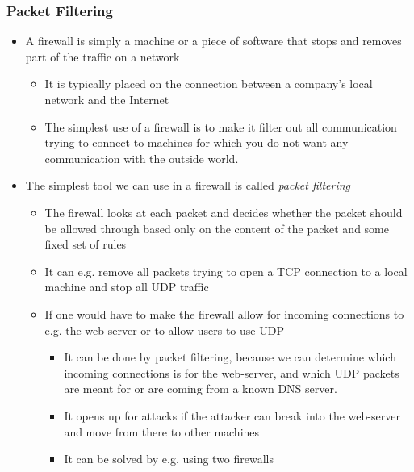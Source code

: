 \documentclass[11pt]{article}
\begin{document}
\subsubsection{Packet Filtering}
\label{sec:org7b58403}
\begin{itemize}
\item A firewall is simply a machine or a piece of software that stops and removes part of the traffic on a network
\begin{itemize}
\item It is typically placed on the connection between a company's local network and the Internet
\item The simplest use of a firewall is to make it filter out all communication trying to connect to machines for which you do not want any communication with the outside world.
\end{itemize}

\item The simplest tool we can use in a firewall is called \emph{packet filtering}
\begin{itemize}
\item The firewall looks at each packet and decides whether the packet should be allowed through based only on the content of the packet and some fixed set of rules
\item It can e.g. remove all packets trying to open a TCP connection to a local machine and stop all UDP traffic
\item If one would have to make the firewall allow for incoming connections to e.g. the web-server or to allow users to use UDP
\begin{itemize}
\item It can be done by packet filtering, because we can determine which incoming connections is for the web-server, and which UDP packets are meant for or are coming from a known DNS server.
\item It opens up for attacks if the attacker can break into the web-server and move from there to other machines
\item It can be solved by e.g. using two firewalls
\end{itemize}


\end{itemize}
\end{itemize}
\end{document}
